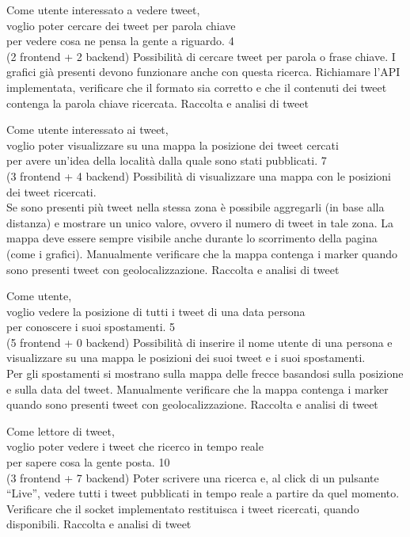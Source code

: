 \userstory%
{Come utente interessato a vedere tweet,\\voglio poter cercare dei tweet per parola chiave\\per vedere cosa ne pensa la gente a riguardo.}%
{4\\(2 frontend + 2 backend)}%
{Possibilità di cercare tweet per parola o frase chiave. I grafici già presenti devono funzionare anche con questa ricerca.}%
{Richiamare l'API implementata, verificare che il formato sia corretto e che il contenuti dei tweet contenga la parola chiave ricercata.}
{Raccolta e analisi di tweet}

\userstory%
{Come utente interessato ai tweet,\\voglio poter visualizzare su una mappa la posizione dei tweet cercati\\per avere un'idea della località dalla quale sono stati pubblicati.}%
{7\\(3 frontend + 4 backend)}%
{Possibilità di visualizzare una mappa con le posizioni dei tweet ricercati.\\
Se sono presenti più tweet nella stessa zona è possibile aggregarli (in base alla distanza) e mostrare un unico valore, 
ovvero il numero di tweet in tale zona. La mappa deve essere sempre visibile anche durante lo scorrimento della pagina (come i grafici).}%
{Manualmente verificare che la mappa contenga i marker quando sono presenti tweet con geolocalizzazione.}
{Raccolta e analisi di tweet}

\userstory%
{Come utente,\\voglio vedere la posizione di tutti i tweet di una data persona\\per conoscere i suoi spostamenti.}%
{5\\(5 frontend + 0 backend)}%
{Possibilità di inserire il nome utente di una persona e visualizzare su una mappa le posizioni dei suoi tweet e i suoi spostamenti.\\
Per gli spostamenti si mostrano sulla mappa delle frecce basandosi sulla posizione e sulla data del tweet.}%
{Manualmente verificare che la mappa contenga i marker quando sono presenti tweet con geolocalizzazione.}
{Raccolta e analisi di tweet}

\userstory%
{Come lettore di tweet,\\voglio poter vedere i tweet che ricerco in tempo reale\\per sapere cosa la gente posta.}%
{10\\(3 frontend + 7 backend)}%
{Poter scrivere una ricerca e, al click di un pulsante “Live”, vedere tutti i tweet pubblicati in tempo reale a partire da quel momento.}%
{Verificare che il socket implementato restituisca i tweet ricercati, quando disponibili.}
{Raccolta e analisi di tweet}

